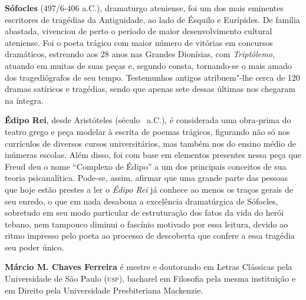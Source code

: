 \textbf{Sófocles} (497/6-406 a.C.), dramaturgo ateniense, foi um dos mais eminentes 
escritores de tragédias da Antiguidade, ao lado de Ésquilo e Eurípides. De família abastada, vivenciou de perto 
o período de maior desenvolvimento cultural ateniense. Foi o poeta trágico com maior 
número de vitórias em concursos dramáticos, estreando aos 28 anos nas Grandes Dionísias, com \textit{Triptólemo}, 
atuando em muitas de suas peças e, segundo consta, tornando-se o mais amado dos tragediógrafos de seu tempo. 
Testemunhos antigos atribuem"-lhe cerca de 120 dramas satíricos e tragédias, sendo que apenas sete dessas últimas nos chegaram na íntegra. 


\textbf{Édipo Rei}, desde Aristóteles (século~ a.C.), é considerada uma
obra-prima do teatro grego e peça modelar à escrita de poemas trágicos, 
figurando não só nos currículos de diversos
cursos universitários, mas também nos do ensino médio de inúmeras
escolas. Além disso, foi com base em elementos presentes nessa
peça que Freud deu o nome ``Complexo de Édipo'' a um dos principais
conceitos de sua teoria psicanalítica. Pode-se, assim, afirmar que uma grande 
parte das pessoas que hoje estão prestes
a ler o \textit{Édipo Rei} já conhece ao menos os traços
gerais de seu enredo, o que em nada desabona a excelência dramatúrgica de Sófocles,
sobretudo em seu modo particular de estruturação dos fatos da vida do herói
tebano, nem tampouco diminui o fascínio motivado por essa leitura, 
devido ao ritmo impresso pelo poeta ao processo de descoberta que
confere a essa tragédia seu poder único.


\textbf{Márcio M. Chaves Ferreira} é mestre e doutorando em Letras Clássicas pela Universidade 
de São Paulo (\textsc{usp}), bacharel em Filosofia pela mesma instituição e em Direito pela 
Universidade Presbiteriana Mackenzie.\par
